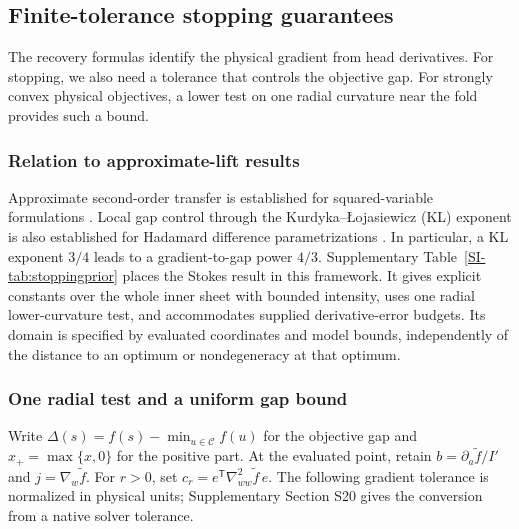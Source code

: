 \documentclass[pdflatex,sn-mathphys-num]{sn-jnl}
\begin{document}
\subsection{Finite-tolerance stopping guarantees}
\label{sec:stoppingguarantees}
The recovery formulas identify the physical gradient from head derivatives. For stopping, we also need a tolerance that controls the objective gap. For strongly convex physical objectives, a lower test on one radial curvature near the fold provides such a bound.

\subsubsection{Relation to approximate-lift results}
Approximate second-order transfer is established for squared-variable formulations \cite[Thm.~3.6 and Cor.~3.7]{dingwright}. Local gap control through the Kurdyka--\L{}ojasiewicz (KL) exponent is also established for Hadamard difference parametrizations \cite[Thm.~3.11 and Rem.~3.12]{ouyang}. In particular, a KL exponent $3/4$ leads to a gradient-to-gap power $4/3$. Supplementary Table~\ref{SI-tab:stoppingprior} places the Stokes result in this framework. It gives explicit constants over the whole inner sheet with bounded intensity, uses one radial lower-curvature test, and accommodates supplied derivative-error budgets. Its domain is specified by evaluated coordinates and model bounds, independently of the distance to an optimum or nondegeneracy at that optimum.



\subsubsection{One radial test and a uniform gap bound}
Write $\Delta(s)=f(s)-\min_{u\in\mathcal C}f(u)$ for the objective gap and $x_+=\max\{x,0\}$ for the positive part. At the evaluated point, retain $b=\partial_a\widetilde f/I'$ and $j=\nabla_w\widetilde f$. For $r>0$, set $c_r=e^{\mathsf T}\nabla^2_{ww}\widetilde f\,e$. The following gradient tolerance is normalized in physical units; Supplementary Section S20 gives the conversion from a native solver tolerance.
\end{document}
